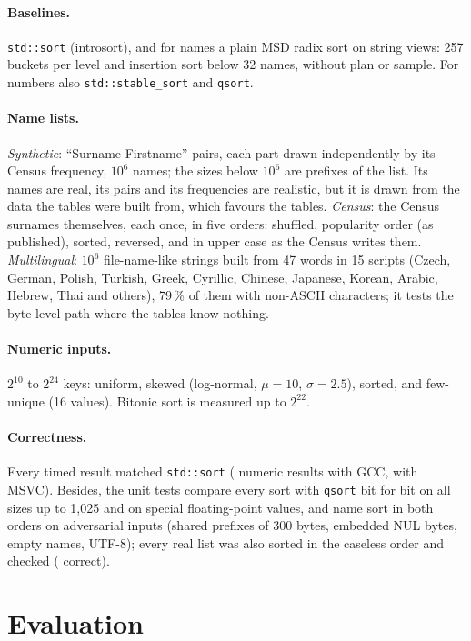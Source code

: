 \documentclass[11pt]{article}
\theoremstyle{definition}
\begin{document}
\paragraph{Baselines.} \texttt{std::sort} (introsort), and for names a plain
MSD radix sort on string views: 257 buckets per level and insertion sort
below 32 names, without plan or sample. For numbers also
\texttt{std::stable\_sort} and \texttt{qsort}.

\paragraph{Name lists.} \emph{Synthetic}: ``Surname Firstname'' pairs, each
part drawn independently by its Census frequency, $10^6$ names; the sizes
below $10^6$ are prefixes of the list. Its names are real, its pairs and its
frequencies are realistic, but it is drawn from the data the tables were
built from, which favours the tables. \emph{Census}: the 
Census surnames themselves, each once, in five orders: shuffled, popularity
order (as published), sorted, reversed, and in upper case as the Census
writes them. \emph{Multilingual}: $10^6$ file-name-like strings built from 47
words in 15 scripts (Czech, German, Polish, Turkish, Greek, Cyrillic, Chinese,
Japanese, Korean, Arabic, Hebrew, Thai and others), 79\,\% of them with
non-ASCII characters; it tests the byte-level path where the tables know
nothing.

\paragraph{Numeric inputs.} $2^{10}$ to $2^{24}$ keys: uniform, skewed
(log-normal, $\mu = 10$, $\sigma = 2.5$), sorted, and few-unique (16
values). Bitonic sort is measured up to $2^{22}$.

\paragraph{Correctness.} Every timed result matched \texttt{std::sort}
( numeric results with GCC,  with MSVC).
Besides, the unit tests compare every sort with \texttt{qsort} bit for bit on
all sizes up to 1{,}025 and on special floating-point values, and name sort in
both orders on adversarial inputs (shared prefixes of 300 bytes, embedded NUL
bytes, empty names, UTF-8); every real list was also sorted in the caseless
order and checked ( correct).

\section{Evaluation}\label{sec:eval}
\end{document}
